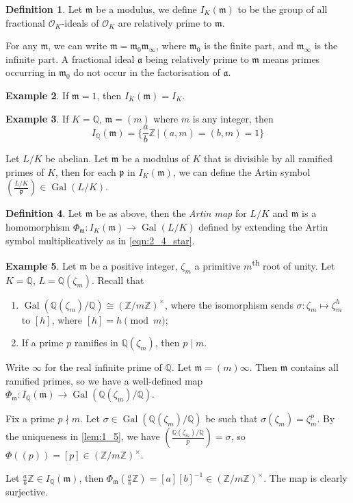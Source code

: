 \documentclass[11pt]{article}
\theoremstyle{definition}
\newtheorem{definition}{Definition}[section]
\newtheorem{example}[definition]{Example}
\theoremstyle{plain}
\theoremstyle{remark}
\DeclareMathOperator{\Gal}{Gal}
\newcommand{\ZZ}{\mathbb{Z}}
\newcommand{\QQ}{\mathbb{Q}}
\newcommand{\cO}{\mathcal{O}}
\newcommand{\fa}{\mathfrak{a}}
\newcommand{\fp}{\mathfrak{p}}
\newcommand{\fm}{\mathfrak{m}}
\newcommand{\leg}[2]{\left(\frac{#1}{#2}\right)}
\begin{document}
\begin{definition}\label{def:2_7}
    Let $\fm$ be a modulus, we define $I_K(\fm)$ to be the group of all fractional $\cO_K$-ideals of $\cO_K$ are relatively prime to $\fm$.
\end{definition}

For any $\fm$, we can write $\fm = \fm_0 \fm_\infty$, where $\fm_0$ is the finite part, and $\fm_\infty$ is the infinite part. A fractional ideal $\fa$ being relatively prime to $\fm$ means primes occurring in $\fm_0$ do not occur in the factorisation of $\fa$.

\begin{example}\label{eg:2_8}
    If $\fm = 1$, then $I_K(\fm) = I_K$.
\end{example}

\begin{example}\label{eg:2_9}
    If $K = \QQ$, $\fm = (m)$ where $m$ is any integer, then
    \begin{equation*}
        I_\QQ(\fm) = \bigg\{ \frac{a}{b}\ZZ \,\bigg\vert\, (a, m) = (b, m) = 1 \bigg\}
    \end{equation*}
\end{example}

Let $L/K$ be abelian. Let $\fm$ be a modulus of $K$ that is divisible by all ramified primes of $K$, then for each $\fp$ in $I_K(\fm)$, we can define the Artin symbol $\leg{L/K}{\fp} \in \Gal(L/K)$.

\begin{definition}\label{def:2_10}
    Let $\fm$ be as above, then the \emph{Artin map} for $L/K$ and $\fm$ is a homomorphism $\Phi_{\fm} : I_K(\fm) \to \Gal(L/K)$ defined by extending the Artin symbol multiplicatively as in \eqref{eqn:2_4_star}.
\end{definition}

\begin{example}\label{eg:2_11}
    Let $\fm$ be a positive integer, $\zeta_m$ a primitive $m$\textsuperscript{th} root of unity. Let $K = \QQ$, $L = \QQ(\zeta_m)$. Recall that
    \begin{enumerate}
        \item $\Gal(\QQ(\zeta_m) / \QQ) \cong (\ZZ / m \ZZ)^\times$, where the isomorphism sends $\sigma : \zeta_m \mapsto \zeta_m^h$ to $[h]$, where $[h] = h \pmod{m}$;
        \item If a prime $p$ ramifies in $\QQ(\zeta_m)$, then $p \mid m$.
    \end{enumerate}
    Write $\infty$ for the real infinite prime of $\QQ$. Let $\fm = (m) \infty$. Then $\fm$ contains all ramified primes, so we have a well-defined map $\Phi_\fm : I_\QQ(\fm) \to \Gal(\QQ(\zeta_m) / \QQ)$.

    {\color{blue}
        Fix a prime $p \nmid m$. Let $\sigma \in \Gal(\QQ(\zeta_m) / \QQ)$ be such that $\sigma(\zeta_m) = \zeta_m^p$. By the uniqueness in \autoref{lem:1_5}, we have $\leg{\QQ(\zeta_m) / \QQ}{p} = \sigma$, so $\Phi((p)) = [p] \in (\ZZ / m \ZZ)^\times$.
    }

    Let $\frac{a}{b}\ZZ \in I_\QQ(\fm)$, then $\Phi_\fm(\frac{a}{b} \ZZ) = [a][b]^{-1} \in (\ZZ / m \ZZ)^\times$.
    The map is clearly surjective.
\end{example}
\end{document}
